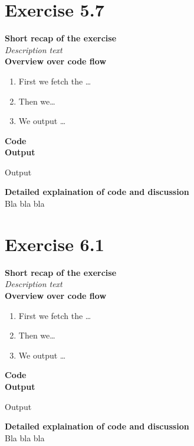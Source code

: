 \documentclass{article}
\newcommand\pythonstyle{\lstset{
language=python,
breaklines=true,
basicstyle=\ttfamily\small,
otherkeywords={1, 2, 3, 4, 5, 6, 7, 8 ,9 , 0, -, =, +, [, ], (, ), \{, \}, :, *, !},             %
keywordstyle=\color{blue},
emph={class, pass, in, for, while, if, is, elif, else, not, and, or, OR
    def, print, exec, break, continue, return},
emphstyle=\color{black}\bfseries,
emph={[2]True, False, None, self},
emphstyle=[2]\color{purple},
emph={[3]from, import, as},
emphstyle=[3]\color{blue},
stringstyle=\color{red},
frame=tb,
showstringspaces=false,
morecomment=[s]{"""}{"""},
commentstyle=\color{gray},
rulesepcolor=\color{blue},
title=\lstname
}}
\newcommand\pythonexternal[2][]{{
\pythonstyle
}}
\begin{document}
\section{Exercise 5.7}
\textbf{Short recap of the exercise}\\
\textit{Description text}\\

\textbf{Overview over code flow}\\

\begin{enumerate}
  \item First we fetch the \ldots
  \item Then we\ldots
  \item We output \ldots\\
\end{enumerate}

\textbf{Code}\\
\textbf{Output}
\begin{pythonOutput}
Output
\end{pythonOutput}
\textbf{Detailed explaination of code and discussion}\\
Bla bla bla


\section{Exercise 6.1}
\textbf{Short recap of the exercise}\\
\textit{Description text}\\

\textbf{Overview over code flow}\\

\begin{enumerate}
  \item First we fetch the \ldots
  \item Then we\ldots
  \item We output \ldots\\
\end{enumerate}

\textbf{Code}\\
\textbf{Output}
\begin{pythonOutput}
Output
\end{pythonOutput}
\textbf{Detailed explaination of code and discussion}\\
Bla bla bla
\end{document}
